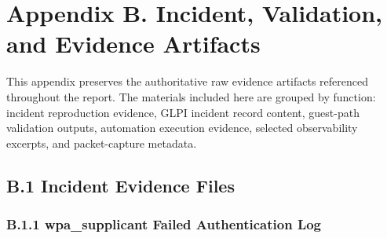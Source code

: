\documentclass[11pt]{article}
\begin{document}
\appendix

\section{Appendix B. Incident, Validation, and Evidence Artifacts}
\label{sec:appendix-b-incident-validation-and-evidence-artifacts}

This appendix preserves the authoritative raw evidence artifacts referenced throughout the report. The materials included here are grouped by function: incident reproduction evidence, GLPI incident record content, guest-path validation outputs, automation execution evidence, selected observability excerpts, and packet-capture metadata.


\subsection{B.1 Incident Evidence Files}
\label{sec:appendix-b-incident-evidence-files}


\subsubsection{B.1.1 wpa\_supplicant Failed Authentication Log}
\label{sec:appendix-b-wpa-supplicant-failed-auth-incident-log}
\end{document}
